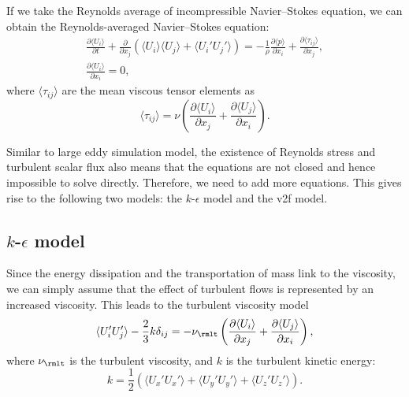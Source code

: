 \documentclass[english, nochinese]{pkupaper}
\begin{document}
If we take the Reynolds average of incompressible Navier--Stokes equation, we can obtain the Reynolds-averaged Navier--Stokes equation:
\begin{gather}
\frac{\partial\langle U_i\rangle}{\partial t} + \frac{\partial}{\partial x_j}\left(\langle U_i\rangle\langle U_j\rangle + \langle U_i'U_j'\rangle\right) = - \frac{1}{\rho} \frac{\partial\langle p\rangle}{\partial x_i} + \frac{\partial\langle\tau_{ij}\rangle}{\partial x_j}, \\
\frac{\partial\langle U_i\rangle}{\partial x_i} = 0,
\end{gather}
where $\langle\tau_{ij}\rangle$ are the mean viscous tensor elements as
\begin{equation}
\langle\tau_{ij}\rangle = \nu\left(\frac{\partial\langle U_i\rangle}{\partial x_j} + \frac{\partial\langle U_j\rangle}{\partial x_i}\right).
\end{equation}

Similar to large eddy simulation model, the existence of Reynolds stress and turbulent scalar flux also means that the equations are not closed and hence impossible to solve directly. Therefore, we need to add more equations. This gives rise to the following two models: the $k$-$\epsilon$ model and the v2f model.

\subsection{$k$-$\epsilon$ model}

Since the energy dissipation and the transportation of mass link to the viscosity, we can simply assume that the effect of turbulent flows is represented by an increased viscosity. This leads to the turbulent viscosity model
\begin{equation}
\langle U_i'U_j'\rangle - \frac{2}{3} k \delta_{ij} = -\nu_{\rmlt}\left(\frac{\partial\langle U_i\rangle}{\partial x_j} + \frac{\partial\langle U_j\rangle}{\partial x_i}\right),
\end{equation}
where $\nu_{\rmlt}$ is the turbulent viscosity, and $k$ is the turbulent kinetic energy:
\begin{equation}
k = \frac{1}{2}(\langle U_x'U_x'\rangle + \langle U_y'U_y'\rangle + \langle U_z'U_z'\rangle).
\end{equation}
\end{document}

